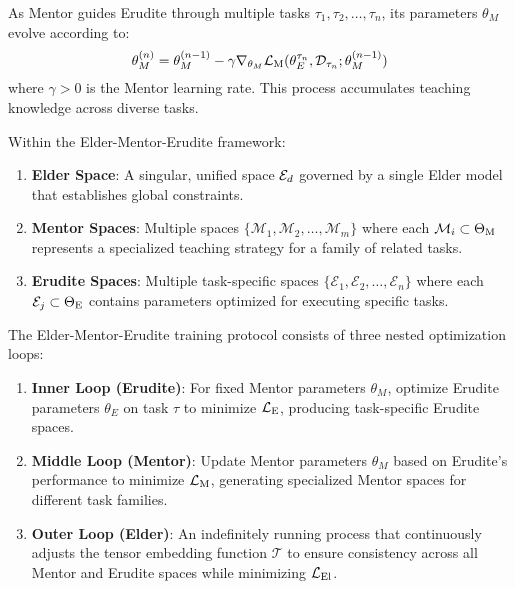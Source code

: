 \begin{proposition}
As Mentor guides Erudite through multiple tasks $\tau_1, \tau_2, \ldots, \tau_n$, its parameters $\theta_M$ evolve according to:
\begin{equation}
\theta_M^{(n)} = \theta_M^{(n-1)} - \gamma \nabla_{\theta_M} \mathcal{L}_{\text{M}}(\theta_E^{\tau_n}, \mathcal{D}_{\tau_n}; \theta_M^{(n-1)})
\end{equation}
where $\gamma > 0$ is the Mentor learning rate. This process accumulates teaching knowledge across diverse tasks.
\end{proposition}

\begin{definition}
Within the Elder-Mentor-Erudite framework:
\begin{enumerate}
    \item \textbf{Elder Space}: A singular, unified space $\mathcal{E}_{d}$ governed by a single Elder model that establishes global constraints.
    \item \textbf{Mentor Spaces}: Multiple spaces $\{\mathcal{M}_1, \mathcal{M}_2, \ldots, \mathcal{M}_m\}$ where each $\mathcal{M}_i \subset \Theta_{\text{M}}$ represents a specialized teaching strategy for a family of related tasks.
    \item \textbf{Erudite Spaces}: Multiple task-specific spaces $\{\mathcal{E}_1, \mathcal{E}_2, \ldots, \mathcal{E}_n\}$ where each $\mathcal{E}_j \subset \Theta_{\text{E}}$ contains parameters optimized for executing specific tasks.
\end{enumerate}
\end{definition}

\begin{definition}
The Elder-Mentor-Erudite training protocol consists of three nested optimization loops:
\begin{enumerate}
    \item \textbf{Inner Loop (Erudite)}: For fixed Mentor parameters $\theta_M$, optimize Erudite parameters $\theta_E$ on task $\tau$ to minimize $\mathcal{L}_{\text{E}}$, producing task-specific Erudite spaces.
    \item \textbf{Middle Loop (Mentor)}: Update Mentor parameters $\theta_M$ based on Erudite's performance to minimize $\mathcal{L}_{\text{M}}$, generating specialized Mentor spaces for different task families.
    \item \textbf{Outer Loop (Elder)}: An indefinitely running process that continuously adjusts the tensor embedding function $\mathcal{T}$ to ensure consistency across all Mentor and Erudite spaces while minimizing $\mathcal{L}_{\text{El}}$.
\end{enumerate}
\end{definition}


